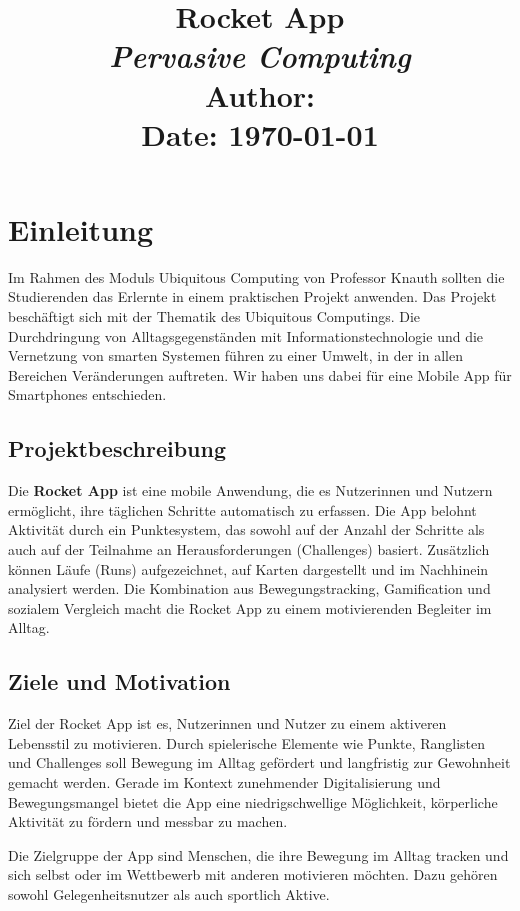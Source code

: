 \documentclass[11pt,a4paper]{article}
\title{
    \vspace{4cm}
    \Huge\textbf{Rocket App} \\
    \LARGE\textit{Pervasive Computing} \\
    \vspace{2cm}
    \large Author: \\
    \large Date: \today \\
    \vfill
}
\date{}
\author{}
\begin{document}
\maketitle
\newpage
\tableofcontents
\newpage

\section{Einleitung}
Im Rahmen des Moduls Ubiquitous Computing von Professor Knauth sollten die
Studierenden das Erlernte in einem praktischen Projekt anwenden.
Das Projekt beschäftigt sich mit der Thematik des Ubiquitous Computings. Die
Durchdringung von Alltagsgegenständen mit Informationstechnologie und die
Vernetzung von smarten Systemen führen zu einer Umwelt, in der in allen Bereichen
Veränderungen auftreten. Wir haben uns dabei für eine Mobile App für Smartphones entschieden.

\subsection{Projektbeschreibung}
Die \textbf{Rocket App} ist eine mobile Anwendung, die es Nutzerinnen und Nutzern ermöglicht, ihre täglichen Schritte automatisch zu erfassen. Die App belohnt Aktivität durch ein Punktesystem, das sowohl auf der Anzahl der Schritte als auch auf der Teilnahme an Herausforderungen (Challenges) basiert. Zusätzlich können Läufe (Runs) aufgezeichnet, auf Karten dargestellt und im Nachhinein analysiert werden. Die Kombination aus Bewegungstracking, Gamification und sozialem Vergleich macht die Rocket App zu einem motivierenden Begleiter im Alltag.

\subsection{Ziele und Motivation}
Ziel der Rocket App ist es, Nutzerinnen und Nutzer zu einem aktiveren Lebensstil zu motivieren. Durch spielerische Elemente wie Punkte, Ranglisten und Challenges soll Bewegung im Alltag gefördert und langfristig zur Gewohnheit gemacht werden. Gerade im Kontext zunehmender Digitalisierung und Bewegungsmangel bietet die App eine niedrigschwellige Möglichkeit, körperliche Aktivität zu fördern und messbar zu machen.

Die Zielgruppe der App sind Menschen, die ihre Bewegung im Alltag tracken und sich selbst oder im Wettbewerb mit anderen motivieren möchten. Dazu gehören sowohl Gelegenheitsnutzer als auch sportlich Aktive.
\end{document}
